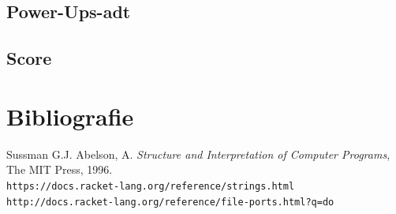 \documentclass[]{article}
\begin{document}
\subsection{Power-Ups-adt}

\subsection{Score}


\section{Bibliografie}
Sussman G.J. Abelson, A. \textit{Structure and Interpretation of Computer Programs}, The MIT Press, 1996. \\
\texttt{https://docs.racket-lang.org/reference/strings.html} \\
\texttt{http://docs.racket-lang.org/reference/file-ports.html?q=do}
\end{document}
